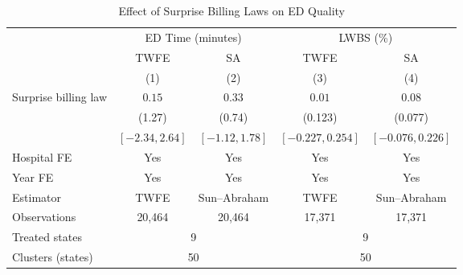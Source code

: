 \begin{table}[htbp]
\centering
\caption{Effect of Surprise Billing Laws on ED Quality}
\label{tab:main}
\begin{tabular}{lcccc}
\hline\hline
 & \multicolumn{2}{c}{ED Time (minutes)} & \multicolumn{2}{c}{LWBS (\%)} \\
\cmidrule(lr){2-3} \cmidrule(lr){4-5}
 & TWFE & SA & TWFE & SA \\
 & (1) & (2) & (3) & (4) \\
\hline
Surprise billing law & $0.15$ & $0.33$ & $0.01$ & $0.08$ \\
 & (1.27) & (0.74) & (0.123) & (0.077) \\
 & $[-2.34, 2.64]$ & $[-1.12, 1.78]$ & $[-0.227, 0.254]$ & $[-0.076, 0.226]$ \\
\hline
Hospital FE & Yes & Yes & Yes & Yes \\
Year FE & Yes & Yes & Yes & Yes \\
Estimator & TWFE & Sun--Abraham & TWFE & Sun--Abraham \\
Observations & 20,464 & 20,464 & 17,371 & 17,371 \\
Treated states & \multicolumn{2}{c}{9} & \multicolumn{2}{c}{9} \\
Clusters (states) & \multicolumn{2}{c}{50} & \multicolumn{2}{c}{50} \\
\hline\hline
\end{tabular}
\par{}
\end{table}
